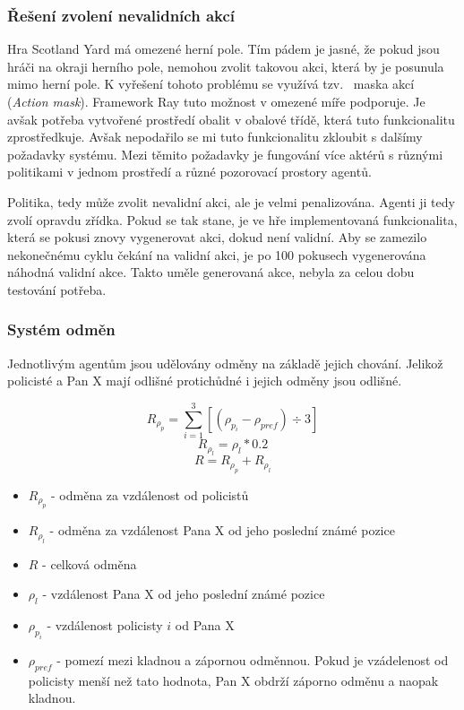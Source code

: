 \subsubsection*{Řešení zvolení nevalidních akcí}

Hra Scotland Yard má omezené herní pole.
Tím pádem je jasné, že pokud jsou hráči na okraji herního pole, nemohou zvolit takovou akci, která by je posunula mimo herní pole.
K vyřešení tohoto problému se využívá tzv.~ maska akcí (\emph{Action mask}).
Framework Ray tuto možnost v omezené míře podporuje.
Je avšak potřeba vytvořené prostředí obalit v obalové třídě, která tuto funkcionalitu zprostředkuje.
Avšak nepodařilo se mi tuto funkcionalitu zkloubit s dalšímy požadavky systému.
Mezi těmito požadavky je fungování více aktérů s různými politikami v jednom prostředí a různé pozorovací prostory agentů.

Politika, tedy může zvolit nevalidní akci, ale je velmi penalizována.
Agenti ji tedy zvolí opravdu zřídka.
Pokud se tak stane, je ve hře implementovaná funkcionalita, která se pokusi znovy vygenerovat akci, dokud není validní.
Aby se zamezilo nekonečnému cyklu čekání na validní akci, je po 100 pokusech vygenerována náhodná validní akce.
Takto uměle generovaná akce, nebyla za celou dobu testování potřeba.

\subsubsection*{Systém odměn}

Jednotlivým agentům jsou udělovány odměny na základě jejich chování.
Jelikož policisté a Pan X mají odlišné protichůdné i jejich odměny jsou odlišné.

\begin{equation}
    \label{eq:odmena_za_vzdalenost_od_policistu}
  R_{\rho_p} = \sum_{i=1}^{3}[(\rho_{p_i} - \rho_{pref}) \div 3]
\end{equation}
\begin{equation}
    \label{eq:odmena_za_vzdalenost_od_posledni_pozice}
  R_{\rho_l} = \rho_l * 0.2
\end{equation}
  \begin{equation}
    \label{eq:celkova_odmena}
  R = R_{\rho_p} + R_{\rho_l}
\end{equation}

\begin{itemize}
  \item $R_{\rho_p}$ - odměna za vzdálenost od policistů
  \item $R_{\rho_l}$ - odměna za vzdálenost Pana X od jeho poslední známé pozice
  \item $R$ - celková odměna
  \item $\rho_l$ - vzdálenost Pana X od jeho poslední známé pozice
  \item $\rho_{p_i}$ - vzdálenost policisty $i$ od Pana X
  \item $\rho_{pref}$ - pomezí mezi kladnou a zápornou odměnnou.
  Pokud je vzádelenost od policisty menší než tato hodnota, Pan X obdrží záporno odměnu a naopak kladnou.
\end{itemize}

